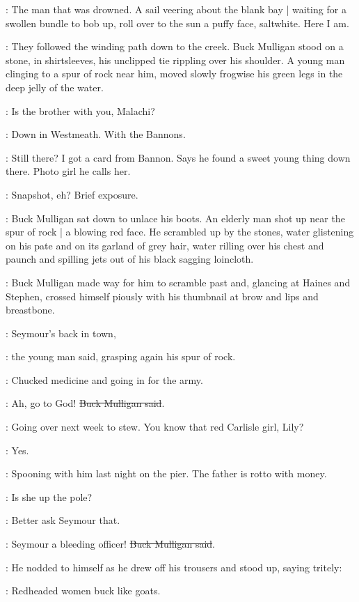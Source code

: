 \StephenInt:
The man that was drowned.
A sail veering about the blank bay |
waiting for a swollen bundle to bob up,
roll over to the sun a puffy face, saltwhite.
Here I am.

:
They followed the winding path down to the creek.
Buck Mulligan stood on a stone,
in shirtsleeves, his unclipped tie rippling over his shoulder.
A young man clinging to a spur of rock near him,
moved slowly frogwise his green legs in the deep jelly of the water.

\YoungMan:
Is the brother with you, Malachi?

\Mulligan:
Down in Westmeath.
With the Bannons.

\YoungMan:
Still there?
I got a card from Bannon.
Says he found a sweet young thing down there.
Photo girl he calls her.

\Mulligan:
Snapshot, eh?
Brief exposure.

:
Buck Mulligan sat down to unlace his boots.
An elderly man shot up near the spur of rock |
a blowing red face.
He scrambled up by the stones,
water glistening on his pate and on its garland of grey hair,
water rilling over his chest and paunch
and spilling jets out of his black sagging loincloth.

:
Buck Mulligan made way for him to scramble past
and, glancing at Haines and Stephen,
crossed himself piously with his thumbnail at brow and lips and breastbone.

\YoungMan:
Seymour's back in town,

:
the young man said,
grasping again his spur of rock.

\YoungMan:
Chucked medicine and going in for the army.

\Mulligan:
Ah, go to God!
\sout{Buck Mulligan said}.

\YoungMan:
Going over next week to stew.
You know that red Carlisle girl, Lily?

\Mulligan:
Yes.

\YoungMan:
Spooning with him last night on the pier.
The father is rotto with money.

\Mulligan:
Is she up the pole?

\YoungMan:
Better ask Seymour that.

\Mulligan:
Seymour a bleeding officer!
\sout{Buck Mulligan said}.

:
He nodded to himself as he drew off his trousers
and stood up, saying tritely:

\Mulligan:
Redheaded women buck like goats.

